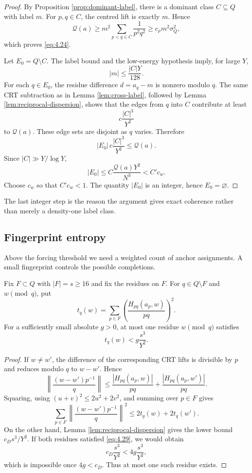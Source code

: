 \begin{proof}
By Proposition \ref{prop:dominant-label}, there is a dominant class $C\subseteq Q$ with label $m$. For $p,q\in C$, the centred lift is exactly $m$. Hence
\[
\mathcal Q(a)
\ge
m^2\sum_{p<q\in C}\frac1{p^2q^2}
\ge
c_\rho m^2\sigma_Q^2,
\]
which proves \eqref{eq:4.24}.

Let $E_0=Q\setminus C$. The label bound and the low-energy hypothesis imply, for large $Y$,
\[
|m|\le\frac{|C|Y}{128}.
\tag{4.25}\label{eq:4.25}
\]
For each $q\in E_0$, the residue difference $d=a_q-m$ is nonzero modulo $q$. The same CRT subtraction as in Lemma \ref{lem:cross-label}, followed by Lemma \ref{lem:reciprocal-dispersion}, shows that the edges from $q$ into $C$ contribute at least
\[
c\frac{|C|^3}{Y^2}
\]
to $\mathcal Q(a)$. These edge sets are disjoint as $q$ varies. Therefore
\[
|E_0|\,c\frac{|C|^3}{Y^2}
\le
\mathcal Q(a).
\tag{4.26}\label{eq:4.26}
\]
Since $|C|\gg Y/\log Y$,
\[
|E_0|
\le
C\frac{\mathcal Q(a)Y^2}{N^3}
<C'c_w.
\tag{4.27}\label{eq:4.27}
\]
Choose $c_w$ so that $C'c_w<1$. The quantity $|E_0|$ is an integer, hence $E_0=\varnothing$.
\end{proof}

The last integer step is the reason the argument gives exact coherence rather than merely a density-one label class.

\subsection{Fingerprint entropy}

Above the forcing threshold we need a weighted count of anchor assignments. A small fingerprint controls the possible completions.

\begin{lemma}\label{lem:fingerprint-rigidity}
Fix $F\subset Q$ with $|F|=s\ge16$ and fix the residues on $F$. For $q\in Q\setminus F$ and $w\pmod q$, put
\[
t_q(w)
=
\sum_{p\in F}
\left(\frac{H_{pq}(a_p,w)}{pq}\right)^2.
\tag{4.28}\label{eq:4.28}
\]
For a sufficiently small absolute $g>0$, at most one residue $w\pmod q$ satisfies
\[
t_q(w)<g\frac{s^3}{Y^2}.
\tag{4.29}\label{eq:4.29}
\]
\end{lemma}

\begin{proof}
If $w\ne w'$, the difference of the corresponding CRT lifts is divisible by $p$ and reduces modulo $q$ to $w-w'$. Hence
\[
\left\|\frac{(w-w')p^{-1}}q\right\|
\le
\frac{|H_{pq}(a_p,w)|}{pq}
+
\frac{|H_{pq}(a_p,w')|}{pq}.
\]
Squaring, using $(u+v)^2\le2u^2+2v^2$, and summing over $p\in F$ gives
\[
\sum_{p\in F}
\left\|\frac{(w-w')p^{-1}}q\right\|^2
\le 2t_q(w)+2t_q(w').
\]
On the other hand, Lemma \ref{lem:reciprocal-dispersion} gives the lower bound $c_Ds^3/Y^2$. If both residues satisfied \eqref{eq:4.29}, we would obtain
\[
c_D\frac{s^3}{Y^2}
<4g\frac{s^3}{Y^2},
\]
which is impossible once $4g<c_D$. Thus at most one such residue exists.
\end{proof}

